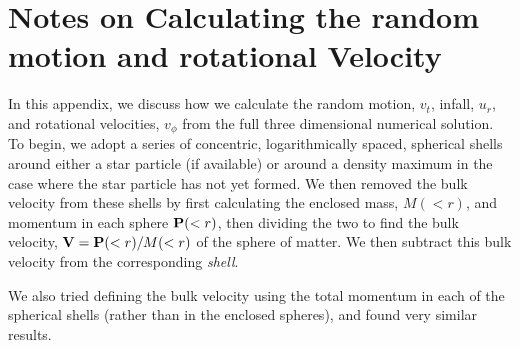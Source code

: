 \documentclass[../dissertation.tex]{subfiles}
\begin{document}
%
%
%
%
%
\section{Notes on Calculating the random motion and rotational Velocity}
\label{Sec:Hydro_velocity}
In this appendix, we discuss how we calculate the random motion, $v_t$, infall, $u_r$, and rotational velocities, $v_{\phi}$ from the full three dimensional numerical solution.  To begin, we adopt a series of concentric, logarithmically spaced, spherical shells around either a star particle (if available) or around a density maximum in the case where the star particle has not yet formed. We then removed the bulk velocity from these shells by first calculating the enclosed mass, $M(<r)$, and momentum in each sphere ${\bf P}(<r)$, then dividing the two to find the bulk velocity, ${\bf V} = {\bf P}(<r)/M(<r)$ of the sphere of matter. We then subtract this bulk velocity from the corresponding {\em shell}. 

We also tried defining the bulk velocity using the total momentum in each of the spherical shells (rather than in the enclosed spheres), and found very similar results.
\end{document}
